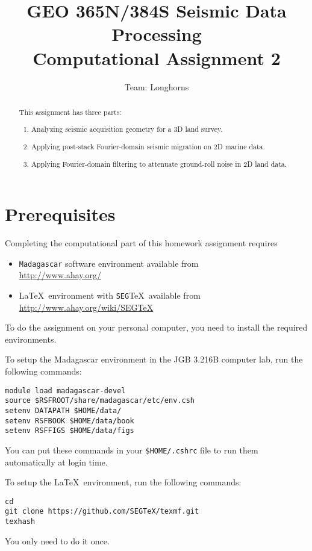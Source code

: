 \author{Team: Longhorns}
\title{GEO 365N/384S Seismic Data Processing \\ Computational Assignment 2}

\begin{abstract}
  This assignment has three parts:
  \begin{enumerate}
  \item Analyzing seismic acquisition geometry for a 3D land survey.     
  \item Applying post-stack Fourier-domain seismic migration on 2D
    marine data.
  \item Applying Fourier-domain filtering to attenuate ground-roll noise in 2D
    land data.                  
  \end{enumerate}
\end{abstract}

\section{Prerequisites}

Completing the computational part of this homework assignment requires
\begin{itemize}
\item \texttt{Madagascar} software environment available from \\
\url{http://www.ahay.org/}
\item \LaTeX\ environment with \texttt{SEG}\TeX\ available from \\ 
\url{http://www.ahay.org/wiki/SEGTeX}
\end{itemize}
To do the assignment on your personal computer, you need to install
the required environments. 

To setup the Madagascar environment in the JGB 3.216B computer lab, run the following commands:
\begin{verbatim}
module load madagascar-devel
source $RSFROOT/share/madagascar/etc/env.csh
setenv DATAPATH $HOME/data/
setenv RSFBOOK $HOME/data/book
setenv RSFFIGS $HOME/data/figs
\end{verbatim}
You can put these commands in your \verb+$HOME/.cshrc+ file to run them automatically at login time.

To setup the \LaTeX\ environment, run the following commands:
\begin{verbatim}
cd
git clone https://github.com/SEGTeX/texmf.git
texhash
\end{verbatim}
You only need to do it once.

